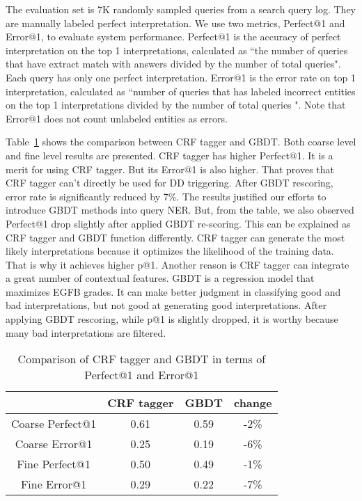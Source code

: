\documentclass{acm_proc_article-sp}
\begin{document}
The evaluation set is 7K randomly sampled queries from a search query log. They are manually labeled perfect interpretation. We use two metrics, Perfect@1 and Error@1, to evaluate system performance. Perfect@1 is the accuracy of perfect interpretation on the top 1 interpretations, calculated as ``the number of queries that have extract match with answers divided by the number of total queries". Each query has only one perfect interpretation. Error@1 is the error rate on top 1 interpretation, calculated as ``number of queries that has labeled incorrect entities on the top 1 interpretations divided by the number of total queries ". Note that Error@1 does not count unlabeled entities as errors. 

Table~\ref{table:pat1} shows the comparison between CRF tagger and GBDT. Both coarse level and fine level results are presented. CRF tagger has higher Perfect@1. It is a merit for using CRF tagger. But its Error@1 is also higher. That proves that CRF tagger can't directly be used for DD triggering. 
After GBDT rescoring, error rate is significantly reduced by 7\%. The results justified our efforts to introduce GBDT methods into query NER. But, from the table, we also observed Perfect@1 drop slightly after applied GBDT re-scoring. This can be explained as CRF tagger and GBDT function differently. CRF tagger can generate the most likely interpretations because it optimizes the likelihood of the training data. That is why it achieves higher p@1. Another reason is CRF tagger can integrate a great number of contextual features. GBDT is a regression model that maximizes EGFB grades.
It can make better judgment in classifying good and bad interpretations, but not good at generating good interpretations. After applying GBDT rescoring, while p@1 is slightly dropped, it is worthy because many bad interpretations are filtered. 






\begin{table}
\begin{center}
\begin{tabular}{|c|c|c|c|}
\hline
& CRF tagger & GBDT & change\\ \hline
Coarse Perfect@1 & 0.61 & 0.59 & -2\% \\
Coarse Error@1 & 0.25 & 0.19 & -6\%\\
Fine Perfect@1 & 0.50 & 0.49 & -1\%\\
Fine Error@1 & 0.29 & 0.22 & -7\%\\
\hline
\end{tabular}
\caption{Comparison of CRF tagger and GBDT in terms of Perfect@1 and Error@1}
\label{table:pat1}
\end{center}
\end{table}
\end{document}
